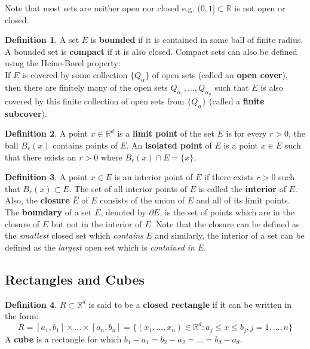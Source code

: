 \documentclass[a4paper, 11pt]{book}
\theoremstyle{definition}
\newtheorem{definition}{Definition}[section]
\theoremstyle{remark}
\begin{document}
    Note that most sets are neither open nor closed e.g. $(0,1]\subset \mathbb{R}$ is not open or closed.

    \begin{definition}
        A set $E$ is \textbf{bounded} if it is contained in some ball of finite radius. A bounded set is \textbf{compact}
        if it is also closed. Compact sets can also be defined using the Heine-Borel property:\\
        If $E$ is covered by some collection $\{Q_{\alpha}\}$ of open sets (called an \textbf{open cover}), then there are
        finitely many of the open sets $Q_{\alpha_1},\hdots,Q_{\alpha_n}$ such that $E$ is also covered by this finite collection
        of open sets from $\{Q_{\alpha}\}$ (called a \textbf{finite subcover}).
    \end{definition}

    \begin{definition}
        A point $x\in\mathbb{R}^d$ is a \textbf{limit point} of the set $E$ is for every $r>0$, the ball $B_r(x)$ contains
        points of $E$. An \textbf{isolated point} of $E$ is a point $x\in E$ such that there exists an $r>0$ where
        $B_r(x)\cap E = \{x\}$.
    \end{definition}

    \begin{definition}
        A point $x\in E$ is an interior point of $E$ if there exists $r>0$ such that $B_r(x) \subset E$. The set of all interior
        points of $E$ is called the \textbf{interior} of $E$. Also, the \textbf{closure} $\overline{E}$ of $E$ consists of the
        union of $E$ and all of its limit points. The \textbf{boundary} of a set $E$, denoted by $\partial{E}$, is the set of
        points which are in the closure of $E$ but not in the interior of $E$. Note that the closure can be defined as the
        \textit{smallest} closed set which \textit{contains} $E$ and similarly, the interior of a set can be defined as the
        \textit{largest} open set which is \textit{contained in} $E$.
    \end{definition}

    \subsection{Rectangles and Cubes}

    \begin{definition}
        $R\subset\mathbb{R}^d$ is said to be a \textbf{closed rectangle} if it can be written in the form:
        \[ R = [a_1,b_1]\times\hdots\times [a_n,b_n] = \{(x_1,\hdots,x_n)\in\mathbb{R}^d: a_j\leq x\leq b_j, j=1,\hdots,n\} \]
        A \textbf{cube} is a rectangle for which $b_1-a_1=b_2-a_2=\hdots=b_d-a_d$.
    \end{definition}
\end{document}
